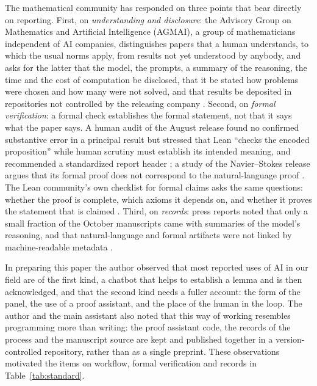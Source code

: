 The mathematical community has responded on three points that bear directly on reporting. First, on
\emph{understanding and disclosure}: the Advisory Group on Mathematics and Artificial Intelligence (AGMAI), a group
of mathematicians independent of AI companies, distinguishes papers that a human understands, to which the usual
norms apply, from results not yet understood by anybody, and asks for the latter that the model, the prompts, a
summary of the reasoning, the time and the cost of computation be disclosed, that it be stated how problems were
chosen and how many were not solved, and that results be deposited in repositories not controlled by the releasing
company \citep{agmai_guidelines_2026}. Second, on \emph{formal verification}: a formal check establishes the formal
statement, not that it says what the paper says. A human audit of the August release found no confirmed substantive
error in a principal result but stressed that Lean ``checks the encoded proposition'' while human scrutiny must
establish its intended meaning, and recommended a standardized report header \citep{sienicki_audit_2026}; a study
of the Navier--Stokes release argues that its formal proof does not correspond to the natural-language proof
\citep{bastounis_lost_2026}. The Lean community's own checklist for formal claims asks the same questions: whether
the proof is complete, which axioms it depends on, and whether it proves the statement that is claimed
\citep{lean_didyouproveit}. Third, on \emph{records}: press reports noted that only a small fraction of the
October manuscripts came with summaries of the model's reasoning, and that natural-language and formal artifacts
were not linked by machine-readable metadata \citep{fernholz_techcrunch_2026,howlett_sciam_2026}.

\begin{discussion}
In preparing this paper the author observed that most reported uses of AI in our field are of the first kind, a
chatbot that helps to establish a lemma and is then acknowledged, and that the second kind needs a fuller account:
the form of the panel, the use of a proof assistant, and the place of the human in the loop. The author and the
main assistant also noted that this way of working resembles programming more than writing: the proof assistant
code, the records of the process and the manuscript source are kept and published together in a version-controlled
repository, rather than as a single preprint. These observations motivated the items on workflow, formal
verification and records in Table~\ref{tab:standard}.
\end{discussion}

